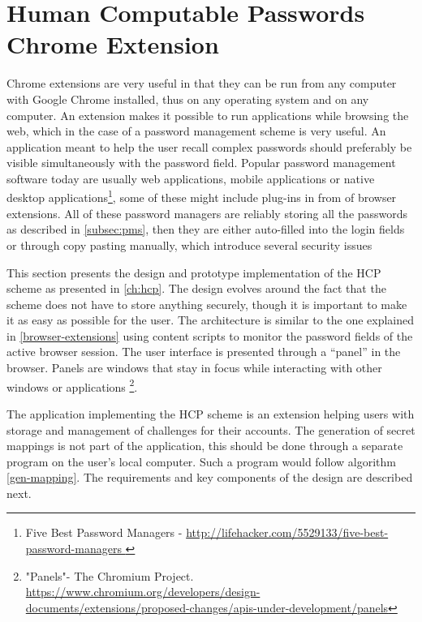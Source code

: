 \section{Human Computable Passwords Chrome Extension}
Chrome extensions are very useful in that they can be run from any computer with Google Chrome installed, thus on any operating system and on any computer. An extension makes it possible to run applications while browsing the web, which in the case of a password management scheme is very useful. An application meant to help the user recall complex passwords should preferably be visible simultaneously with the password field. Popular password management software today are usually web applications, mobile applications or native desktop applications\footnote{Five Best Password Managers - \url{ http://lifehacker.com/5529133/five-best-password-managers }}, some of these might include plug-ins in from of browser extensions. All of these password managers are reliably storing all the passwords as described in \autoref{subsec:pms}, then they are either auto-filled into the login fields or through copy pasting manually, which introduce several security issues \cite{protecting-browsers, javascript-injection, chrome-extension-dangers, carlini-chrome, liu-chrome, pw-managment-attacks}
\par This section presents the design and prototype implementation of the HCP scheme as presented in \autoref{ch:hcp}. The design evolves around the fact that the scheme does not have to store anything securely, though it is important to make it as easy as possible for the user. The architecture is similar to the one explained in \autoref{browser-extensions} using content scripts to monitor the password fields of the active browser session. The user interface is presented through a ``panel'' in the browser. Panels are windows that stay in focus while interacting with other windows or applications \footnote{"Panels"- The Chromium Project. \url{https://www.chromium.org/developers/design-documents/extensions/proposed-changes/apis-under-development/panels}}.


The application implementing the HCP scheme is an extension helping users with storage and management of challenges for their accounts. The generation of secret mappings is not part of the application, this should be done through a separate program on the user's local computer. Such a program would follow algorithm \ref{gen-mapping}. The requirements and key components of the design are described next.



